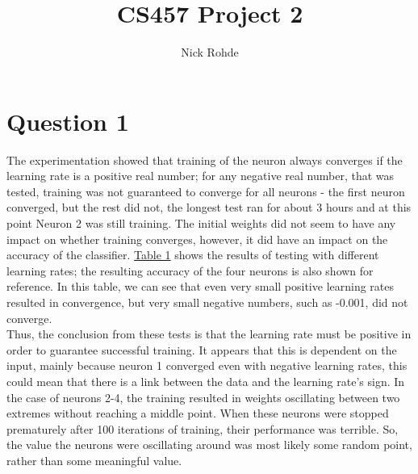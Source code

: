 \documentclass{article}
\title{CS457 Project 2}
\author{Nick Rohde}
\begin{document}
\maketitle
\tableofcontents
\pagebreak

\section{Question 1}
The experimentation showed that training of the neuron always converges if the learning rate is a positive real number; for any negative real number, that was tested, training was not guaranteed to converge for all neurons - the first neuron converged, but the rest did not, the longest test ran for about 3 hours and at this point Neuron 2 was still training. The initial weights  did not seem to have any impact on whether training converges, however, it did have an impact on the accuracy of the classifier. \hyperref[T1]{Table 1} shows the results of testing with different learning rates; the resulting accuracy of the four neurons is also shown for reference. In this table, we can see that even very small positive learning rates resulted in convergence, but very small negative numbers, such as -0.001, did not converge. \\Thus, the conclusion from these tests is that the learning rate must be positive in order to guarantee successful training. It appears that this is dependent on the input, mainly because neuron 1 converged even with negative learning rates, this could mean that there is a link between the data and the learning rate's sign. In the case of neurons 2-4, the training resulted in weights oscillating between two extremes without reaching a middle point. When these neurons were stopped prematurely after 100 iterations of training, their performance was terrible. So, the value the neurons were oscillating around was most likely some random point, rather than some meaningful value.
\end{document}
